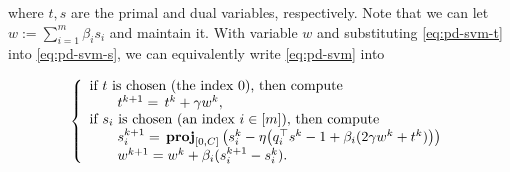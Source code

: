 {where $t,s$ are the primal and dual variables, respectively. Note that we can let $w:=\sum_{i=1}^m \beta_i s_i$ and maintain it. With variable $w$ and substituting \eqref{eq:pd-svm-t} into \eqref{eq:pd-svm-s}, we can equivalently write \eqref{eq:pd-svm} into

\begin{equation}
{\left\{
\begin{array}{l}
\text{if }t\text{ is chosen (the index 0), then compute}\\
\qquad t^{k+1}=\,t^k+\gamma w^k,\\
\text{if }s_i\text{ is chosen (an index $i \in [m]$), then compute}\\
\qquad s_i^{k+1}=\,\prj_{[0,C]}\left(s_i^k-\eta\big(q_i^\top s^k-1+\beta_i(2\gamma w^k+t^k)\big)\right)\\
\qquad w^{k+1}= w^k + \beta_i (s_i^{k+1} - s_i^k).
\end{array}
\right.
}\end{equation}



}
